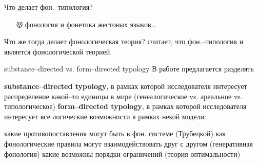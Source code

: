 \begin{frame}{Что делает фон.–типология?}
\begin{itemize}
\mytem классификация фон.–единиц
\vspace{-3mm}
\begin{multicols}{2}
\begin{itemize}
\mytem признаки
\mytem сегменты
\mytem слоги
\mytem ударение
\mytem тоны 
\mytem стопы  (\textsc{sg:} стопа)
\mytem фон.–слова, интонация \\
\hfill и т. п. \ldots
\end{itemize}
\end{multicols}
\vspace{-3mm}
\mytem географическая и статистическая дистрибуция фон.–единиц
\mytem ограничения на последовательности фон.–единиц
\mytem классификация, географическая и статистическая дистрибуция чередований фон.–единиц
\mytem универсалии, см. \href{http://typo.uni-konstanz.de/archive/intro/}{Konstanz  Universals  Archive}
\mytem \textbf{\large + все перечисленное внутри языковых систем} \pause
\item[\texttt{😾}] фонология и фонетика жестовых языков\ldots
\end{itemize} \pause
Что же тогда делает фонологическая теория? \citep{hyman06} считает, что фон.–типология и является фонологической теорией.
\end{frame}
\begin{frame}{substance–directed vs. form–directed typology}
В работе \citep{hyman14} предлагается разделять
\begin{itemize}
\mytem \textbf{substance–directed typology}, в рамках которой исследователя интересует распределение какой–то единицы в мире (генеалогическое vs. ареальное vs. типологическое) 
\mytem \textbf{form–directed typology}, в рамках которой исследователя интересует все логические возможности в рамках некой модели:
\begin{itemize}
\mytem какие противопоставления могут быть в фон. системе (Трубецкой)
\mytem как фонологические правила могут взаимодействовать друг с другом (генеративная фонология)
\mytem какие возможны порядки ограничений (теория оптимальности)
\end{itemize}
\end{itemize}
\end{frame}

